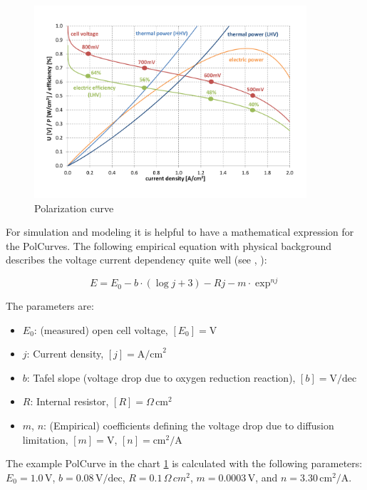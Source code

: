 \documentclass[11pt,a4paper,english,twoside]{scrreprt}
\begin{document}
\begin{figure}
  \centering
  \includegraphics*[width=0.9\textwidth,angle=0]{FCF_Chart_PolCurve.pdf}
  \caption[Polarization curve]{Polarization curve}
  \label{fig:PolCurve}
\end{figure}

For simulation and modeling it is helpful to have a mathematical expression for the PolCurves. The following empirical equation with physical background describes the 
voltage current dependency quite well (see \cite{lit:Srinivasan}, \cite{lit:Kim}):

\begin{equation}
  \label{eqn:E_empirical}
  E = E_0 - b \cdot (\log j +3) - R j - m \cdot \exp^{n j}
\end{equation}

The parameters are:
\begin{itemize}
	\item $E_0$: (measured) open cell voltage, $[E_0]=\si{\volt}$
	\item $j$: Current density, $[j]=\text{A/cm}^{\text{2}}$
	\item $b$: Tafel slope (voltage drop due to oxygen reduction reaction), $[b]=\text{V/dec}$
	\item $R$: Internal resistor, $[R]=\Omega\,\text{cm}^{\text{2}}$
	\item $m$, $n$: (Empirical) coefficients defining the voltage drop due to diffusion limitation, $[m]=\si{\volt}$, $[n]=\text{cm}^\text{2}/\text{A}$

\end{itemize}

The example PolCurve in the chart \ref{fig:PolCurve} is calculated with the following parameters: $E_0=1.0\,\mathrm{V}$, $b=0.08\,\mathrm{V/dec}$, $R=0.1\,\Omega\,cm^2$, $m=0.0003\,\mathrm{V}$, and $n=3.30\,\mathrm{cm^2/A}$.
\end{document}
